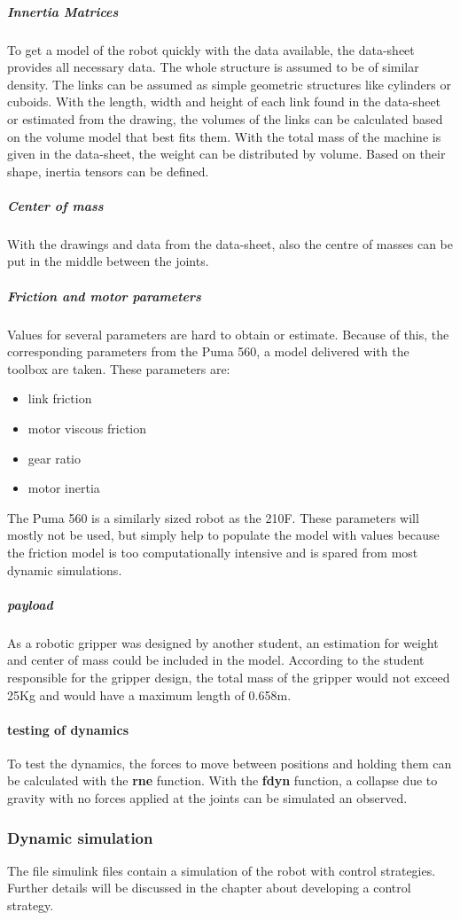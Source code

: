 \subparagraph{Innertia Matrices}
To get a model of the robot quickly with the data available, the data-sheet \cite{210FDatasheet} provides all necessary data. The whole structure is assumed to be of similar density. The links can be assumed as simple geometric structures like cylinders or cuboids. With the length, width and height of each link found in the data-sheet or estimated from the drawing, the volumes of the links can be calculated based on the volume model that best fits them. With the total mass of the machine is given in the data-sheet, the weight can be distributed by volume. Based on their shape, inertia tensors can be defined.\\

\subparagraph{Center of mass}
With the drawings and data from the data-sheet, also the centre of masses can be put in the middle between the joints.

\subparagraph{Friction and motor parameters}
Values for several parameters are hard to obtain or estimate.
Because of this, the corresponding parameters from the Puma 560, a model delivered with the toolbox are taken. These parameters are:\\
\begin{itemize}
	\item link friction
	\item motor viscous friction
	\item gear ratio
	\item motor inertia
\end{itemize}
The Puma 560 is a similarly sized robot as the 210F. These parameters will mostly not be used, but simply help to populate the model with values because the friction model is too computationally intensive and is spared from most dynamic simulations.

\subparagraph{payload}
As a robotic gripper was designed by another student, an estimation for weight and center of mass could be included in the model. According to the student responsible for the gripper design, the total mass of the gripper would not exceed 25Kg and would have a maximum length of 0.658m.

\paragraph{testing of dynamics}
To test the dynamics, the forces to move between positions and holding them can be calculated with the \textbf{rne} function.
With the \textbf{fdyn} function, a collapse due to gravity with no forces applied at the joints can be simulated an observed.
 
\subsubsection{Dynamic simulation}
The file simulink files contain a simulation of the robot with control strategies. Further details will be discussed in the chapter about developing a control strategy.



